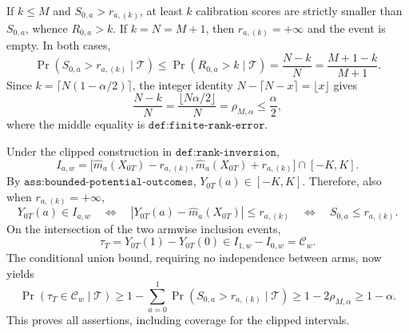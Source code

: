 If \(k\le M\) and \(S_{0,a}>r_{a,(k)}\), at least \(k\) calibration scores are strictly smaller than \(S_{0,a}\), whence \(R_{0,a}>k\). If \(k=N=M+1\), then \(r_{a,(k)}=+\infty\) and the event is empty. In both cases,
\[
\Pr(S_{0,a}>r_{a,(k)}\mid\mathcal T)\le\Pr(R_{0,a}>k\mid\mathcal T)=\frac{N-k}{N}=\frac{M+1-k}{M+1}.
\]
Since \(k=\lceil N(1-\alpha/2)\rceil\), the integer identity \(N-\lceil N-x\rceil=\lfloor x\rfloor\) gives
\[
\frac{N-k}{N}=\frac{\lfloor N\alpha/2\rfloor}{N}=\rho_{M,\alpha}\le\frac{\alpha}{2},
\]
where the middle equality is \(\texttt{def:finite-rank-error}\).

Under the clipped construction in \(\texttt{def:rank-inversion}\),
\[
I_{a,w}=\bigl[\widehat m_a(X_{0T})-r_{a,(k)},\widehat m_a(X_{0T})+r_{a,(k)}\bigr]\cap[-K,K].
\]
By \(\texttt{ass:bounded-potential-outcomes}\), \(Y_{0T}(a)\in[-K,K]\). Therefore, also when \(r_{a,(k)}=+\infty\),
\[
Y_{0T}(a)\in I_{a,w}\quad\Longleftrightarrow\quad |Y_{0T}(a)-\widehat m_a(X_{0T})|\le r_{a,(k)}\quad\Longleftrightarrow\quad S_{0,a}\le r_{a,(k)}.
\]
On the intersection of the two armwise inclusion events,
\[
\tau_T=Y_{0T}(1)-Y_{0T}(0)\in I_{1,w}-I_{0,w}=\mathcal C_w.
\]
The conditional union bound, requiring no independence between arms, now yields
\[
\Pr(\tau_T\in\mathcal C_w\mid\mathcal T)\ge1-\sum_{a=0}^1\Pr(S_{0,a}>r_{a,(k)}\mid\mathcal T)\ge1-2\rho_{M,\alpha}\ge1-\alpha.
\]
This proves all assertions, including coverage for the clipped intervals.
